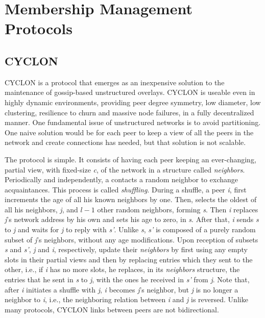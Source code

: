 \documentclass[runningheads]{llncs}
\begin{document}
\newpage\section{Membership Management Protocols}
\subsection{CYCLON} CYCLON\cite{cyclon} is a protocol that emerges as an inexpensive solution to the maintenance of gossip-based unstructured overlays. CYCLON is useable even in highly dynamic environments, providing peer degree symmetry, low diameter, low clustering, resilience to churn and massive node failures, in a fully decentralized manner. One fundamental issue of unstructured networks is to avoid partitioning. One naive solution would be for each peer to keep a view of all the peers in the network and create connections has needed, but that solution is not scalable.

The protocol is simple. It consists of having each peer keeping an ever-changing, partial view, with fixed-size \textit{c}, of the network in a structure called \textit{neighbors}. Periodically and independently, a contacts a random neighbor to exchange acquaintances. This process is called \textit{shuffling}. During a shuffle, a peer \textit{i}, first increments the age of all his known neighbors by one. Then, selects the oldest of all his neighbors, \textit{j}, and $l-1$ other random neighbors, forming \textit{s}. Then \textit{i} replaces \textit{j}'s network address by his own and sets his age to zero, in \textit{s}. After that, \textit{i} sends \textit{s} to \textit{j} and waits for \textit{j} to reply with \textit{s'}. Unlike \textit{s}, \textit{s'} is composed of a purely random subset of \textit{j}'s neighbors, without any age modifications. Upon reception of subsets \textit{s} and \textit{s'}, \textit{j} and \textit{i}, respectively, update their \textit{neighbors} by first using any empty slots in their partial views and then by replacing entries which they sent to the other, i.e., if \textit{i} has no more slots, he replaces, in its \textit{neighbors} structure, the entries that he sent in \textit{s} to \textit{j}, with the ones he received in \textit{s'} from \textit{j}. Note that, after \textit{i} initiates a shuffle with \textit{j}, \textit{i} becomes \textit{j}'s neighbor, but \textit{j} is no longer a neighbor to \textit{i}, i.e., the neighboring relation between \textit{i} and \textit{j} is reversed. Unlike many protocols, CYCLON links between peers are not bidirectional.
\end{document}
